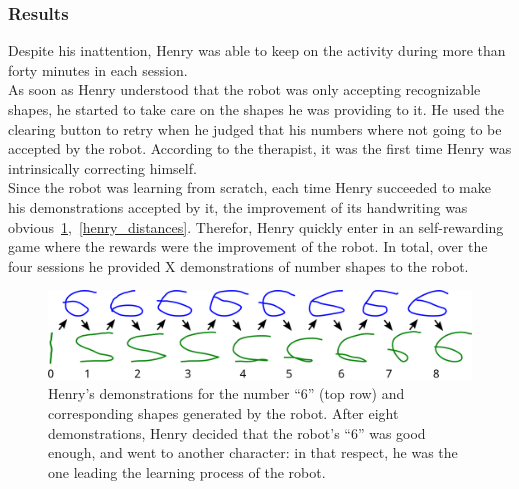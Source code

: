 \documentclass{article}
\begin{document}
\subsubsection{Results}
Despite his inattention, Henry was able to keep on the activity during more than
forty minutes in each session.\\

As soon as Henry understood that the robot was only accepting recognizable
shapes, he started to take care on the shapes he was providing to it. He used the
clearing button to retry when he judged that his numbers where not going to be
accepted by the robot. According to the therapist, it was the first time Henry
was intrinsically correcting himself.\\

Since the robot was learning from scratch, each time Henry succeeded to make his
demonstrations accepted by it, the improvement of its handwriting was
obvious~\ref{learning_6_demos},~\ref{henry_distances}.
Therefor, Henry quickly enter in an self-rewarding game where the rewards were
the improvement of the robot. In total, over the four sessions he provided X
demonstrations of number shapes to the robot.

\begin{figure}
    \centering
    \includegraphics[width=0.9\linewidth]{learning_6_demos}
    \caption{\small Henry's demonstrations for the number ``6'' (top row) and
        corresponding shapes generated by the robot. After eight demonstrations,
        Henry decided that the robot's ``6'' was good enough, and went to
    another character: in that respect, he was the one leading the learning
process of the robot.}
    \label{learning_6_demos}
\end{figure}
\end{document}
